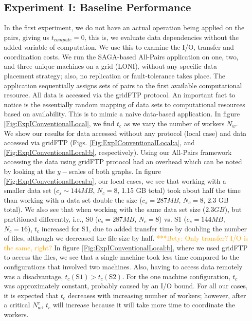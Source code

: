 \documentclass{rspublic}
\newcommand{\betynote}[1]{ {\textcolor{orange} { ***Bety: #1 }}}
\begin{document}
\subsection{Experiment I: Baseline Performance}
In the first experiment, we do not have an actual operation being
applied on the pairs, giving us $t_{compute}=0$, this is, we evaluate
data dependencies without the added variable of computation. We use
this to examine the I/O, transfer and coordination costs. We run the
SAGA-based All-Pairs application on one, two, and three unique machines
on a grid (LONI), without any specific data placement strategy; also,
no replication or fault-tolerance takes place. The application
sequentially assigns sets of pairs to the first available computational
resource. All data is accessed via the gridFTP protocol. An important
fact to notice is the essentially random mapping of data sets to
computational resources based on availability. This is to mimic a naive
data-based application. In figure \ref{Fig:ExpIConventionalLocal}, we
find $t_c$ as we vary the number of workers $N_w$. We show our results
for data accessed without any protocol (local case) and data accessed
via gridFTP (Figs. \ref{Fig:ExpIConventionalLocal:a}, and
\ref{Fig:ExpIConventionalLocal:b}, respectively). Using our All-Pairs
framework accessing the data using gridFTP protocol had an overhead
which can be noted by looking at the $y-$scales of both graphs. In figure
\ref{Fig:ExpIConventionalLocal:a}, our local cases, we see that working
with a smaller data set ($c_s \sim 144MB$, $N_c = 8$, 1.15 GB total)
took about half the time than working with a data set double the size
($c_s = 287MB$, $N_c = 8$, 2.3 GB total). We also see that when working
with the same data set size ($2.3 GB$), but partitioned differently,
i.e., S0 ($c_s = 287MB$, $N_c = 8$) vs. S1 ($c_s = 144MB$, $N_c = 16$),
$t_c$ increased for S1, due to added transfer time by doubling the
number of files, although we decreased the file size by half.
\betynote{Only transfer? I/O is the same, right?}In figure
\ref{Fig:ExpIConventionalLocal:b}, where we used gridFTP to access the
files, we see that a single machine took less time compared to the
configurations that involved two machines. Also, having to access data
remotely was a disadvantage, $t_c(\mbox{S1}) > t_c(\mbox{S2})$. For the
one machine configuration, $t_c$ was approximately constant, probably
caused by an I/O bound. For all our cases, it is expected that $t_c$
decreases with increasing number of workers; however, after a critical
$N^c_w$, $t_c$ will increase because it will take more time to
coordinate the workers.
\end{document}
